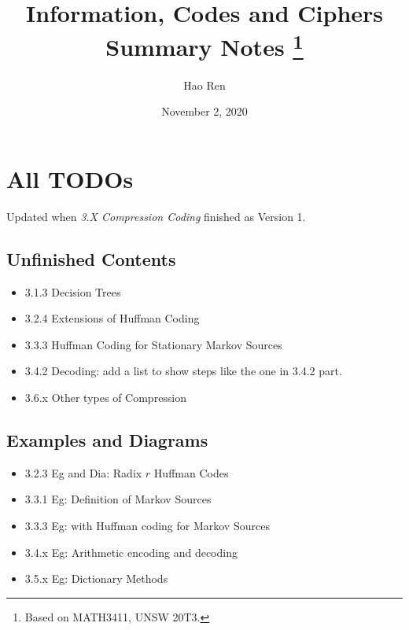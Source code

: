 \documentclass{article}
\begin{document}
\title{Information, Codes and Ciphers \\
       \vspace{.625em} Summary Notes \footnote{Based on MATH3411, UNSW 20T3.}}
\author{Hao Ren}
\date{November 2, 2020}
\maketitle

\newpage

\tableofcontents

\newpage

\setcounter{section}{-1}

\section{All TODOs}

Updated when \emph{3.X Compression Coding} finished as Version 1.

\subsection{Unfinished Contents}

\begin{itemize}
    \item 3.1.3 Decision Trees
    \item 3.2.4 Extensions of Huffman Coding
    \item 3.3.3 Huffman Coding for Stationary Markov Sources
    \item 3.4.2 Decoding: add a list to show steps like the one in 3.4.2 part.
    \item 3.6.x Other types of Compression
\end{itemize}

\subsection{Examples and Diagrams}

\begin{itemize}
    \item 3.2.3 Eg and Dia: Radix $r$ Huffman Codes
    \item 3.3.1 Eg: Definition of Markov Sources
    \item 3.3.3 Eg: with Huffman coding for Markov Sources
    \item 3.4.x Eg: Arithmetic encoding and decoding
    \item 3.5.x Eg: Dictionary Methods
\end{itemize}
\end{document}
